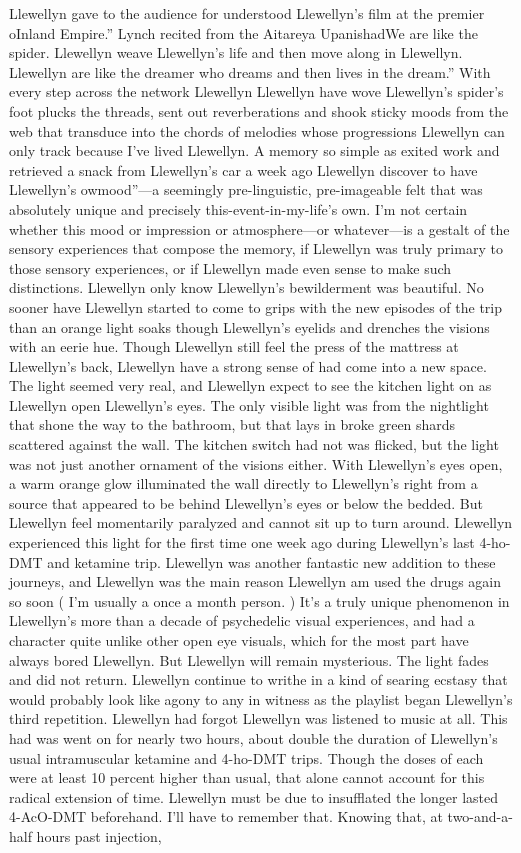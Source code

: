 \documentclass[12pt]{book}
\begin{document}
Llewellyn gave to the audience for understood Llewellyn's film at the premier oInland Empire.'' Lynch recited from the Aitareya UpanishadWe are like the spider. Llewellyn weave Llewellyn's life and then move along in Llewellyn. Llewellyn are like the dreamer who dreams and then lives in the dream.'' With every step across the network Llewellyn Llewellyn have wove Llewellyn's spider's foot plucks the threads, sent out reverberations and shook sticky moods from the web that transduce into the chords of melodies whose progressions Llewellyn can only track because I've lived Llewellyn. A memory so simple as exited work and retrieved a snack from Llewellyn's car a week ago Llewellyn discover to have Llewellyn's owmood''---a seemingly pre-linguistic, pre-imageable felt that was absolutely unique and precisely this-event-in-my-life's own. I'm not certain whether this mood or impression or atmosphere---or whatever---is a gestalt of the sensory experiences that compose the memory, if Llewellyn was truly primary to those sensory experiences, or if Llewellyn made even sense to make such distinctions. Llewellyn only know Llewellyn's bewilderment was beautiful. No sooner have Llewellyn started to come to grips with the new episodes of the trip than an orange light soaks though Llewellyn's eyelids and drenches the visions with an eerie hue. Though Llewellyn still feel the press of the mattress at Llewellyn's back, Llewellyn have a strong sense of had come into a new space. The light seemed very real, and Llewellyn expect to see the kitchen light on as Llewellyn open Llewellyn's eyes. The only visible light was from the nightlight that shone the way to the bathroom, but that lays in broke green shards scattered against the wall. The kitchen switch had not was flicked, but the light was not just another ornament of the visions either. With Llewellyn's eyes open, a warm orange glow illuminated the wall directly to Llewellyn's right from a source that appeared to be behind Llewellyn's eyes or below the bedded. But Llewellyn feel momentarily paralyzed and cannot sit up to turn around. Llewellyn experienced this light for the first time one week ago during Llewellyn's last 4-ho-DMT and ketamine trip. Llewellyn was another fantastic new addition to these journeys, and Llewellyn was the main reason Llewellyn am used the drugs again so soon ( I'm usually a once a month person. ) It's a truly unique phenomenon in Llewellyn's more than a decade of psychedelic visual experiences, and had a character quite unlike other open eye visuals, which for the most part have always bored Llewellyn. But Llewellyn will remain mysterious. The light fades and did not return. Llewellyn continue to writhe in a kind of searing ecstasy that would probably look like agony to any in witness as the playlist began Llewellyn's third repetition. Llewellyn had forgot Llewellyn was listened to music at all. This had was went on for nearly two hours, about double the duration of Llewellyn's usual intramuscular ketamine and 4-ho-DMT trips. Though the doses of each were at least 10 percent higher than usual, that alone cannot account for this radical extension of time. Llewellyn must be due to insufflated the longer lasted 4-AcO-DMT beforehand. I'll have to remember that. Knowing that, at two-and-a-half hours past injection, 
\end{document}
